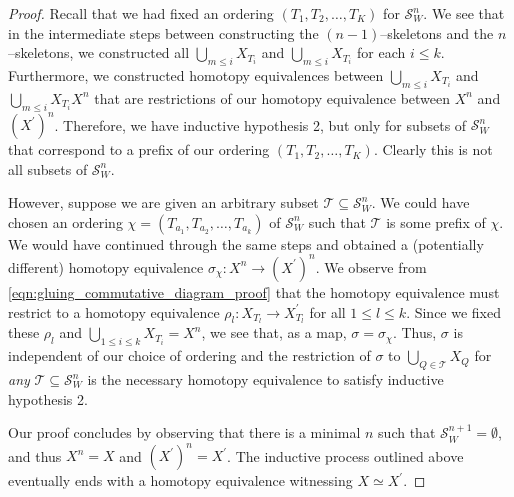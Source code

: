 \documentclass[class=article, crop=false]{standalone}
\begin{document}
\begin{proof}
    Recall that we had fixed an ordering $(T_1, T_2, \ldots , T_K)$ for $\mathcal{S}^{n}_W$. We see that in the intermediate steps between constructing the $(n-1)$--skeletons and the $n$--skeletons, we constructed all $\bigcup_{m \leq i} X_{T_i}$ and $\bigcup_{m \leq i} X_{T_i}$ for each $i\leq k$. Furthermore, we constructed homotopy equivalences between $\bigcup_{m \leq i} X_{T_i}$ and $\bigcup_{m \leq i} X_{T_i}$$X^n$ that are restrictions of our homotopy equivalence between $X^n$ and $(X^\prime)^n$. Therefore, we have inductive hypothesis 2, but only for subsets of $\mathcal{S}_W^n$ that correspond to a prefix of our ordering $(T_1, T_2, \ldots , T_K)$. Clearly this is not all subsets of $\mathcal{S}_W^n$.
    
    However, suppose we are given an arbitrary subset $\mathcal{T} \subseteq \mathcal{S}_W^n$. We could have chosen an ordering $\chi = (T_{a_1}, T_{a_2}, \ldots, T_{a_k})$ of $\mathcal{S}^n_W$ such that $\mathcal{T}$ is some prefix of $\chi$. We would have continued through the same steps and obtained a (potentially different) homotopy equivalence $\sigma_\chi \colon X^n \to (X^\prime)^n$. We observe from \eqref{eqn:gluing_commutative_diagram_proof} that the homotopy equivalence must restrict to a homotopy equivalence $\rho_l \colon X_{T_l} \to X^\prime_{T_l}$ for all $1\leq l \leq k$. Since we fixed these $\rho_l$ and $ \bigcup_{1\leq i\leq k} X_{T_i} = X^n$, we see that, as a map, $\sigma = \sigma_\chi$. Thus, $\sigma$ is independent of our choice of ordering and the restriction of $\sigma$ to $\bigcup_{Q \in \mathcal{T}}X_Q$ for \emph{any} $\mathcal{T}\subseteq \mathcal{S}^n_W$ is the necessary homotopy equivalence to satisfy inductive hypothesis 2.
    
    Our proof concludes by observing that there is a minimal $n$ such that $\mathcal{S}^{n+1}_W = \emptyset$, and thus $X^n = X$ and $(X^\prime)^n = X^\prime$. The inductive process outlined above eventually ends with a homotopy equivalence witnessing $X \simeq X^\prime$.
\end{proof}
\end{document}

